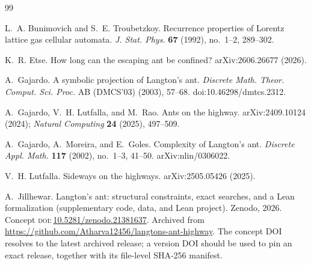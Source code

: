 \documentclass[11pt,reqno]{amsart}
\theoremstyle{plain}
\theoremstyle{definition}
\begin{document}
\begin{thebibliography}{99}

L.~A. Bunimovich and S.~E. Troubetzkoy.
\newblock Recurrence properties of {L}orentz lattice gas cellular automata.
\newblock \emph{J. Stat. Phys.} \textbf{67} (1992), no.~1--2, 289--302.

K.~R. Etse.
\newblock How long can the escaping ant be confined?
\newblock arXiv:2606.26677 (2026).

A.~Gajardo.
\newblock A symbolic projection of {L}angton's ant.
\newblock \emph{Discrete Math. Theor. Comput. Sci. Proc.} AB (DMCS'03)
  (2003), 57--68.
\newblock doi:10.46298/dmtcs.2312.

A.~Gajardo, V.~H. Lutfalla, and M.~Rao.
\newblock Ants on the highway.
\newblock arXiv:2409.10124 (2024); \emph{Natural Computing} \textbf{24} (2025), 497--509.

A.~Gajardo, A.~Moreira, and E.~Goles.
\newblock Complexity of {L}angton's ant.
\newblock \emph{Discrete Appl. Math.} \textbf{117} (2002), no.~1--3, 41--50.
\newblock arXiv:nlin/0306022.

V.~H. Lutfalla.
\newblock Sideways on the highways.
\newblock arXiv:2505.05426 (2025).

A.~Jillhewar.
\newblock Langton's ant: structural constraints, exact searches, and a Lean
formalization (supplementary code, data, and Lean project).
\newblock Zenodo, 2026. Concept \textsc{doi}:\,\href{https://doi.org/10.5281/zenodo.21381637}{10.5281/zenodo.21381637}.
\newblock Archived from \url{https://github.com/Atharva12456/langtons-ant-highway}.
\newblock The concept DOI resolves to the latest archived release; a version DOI should
be used to pin an exact release, together with its file-level SHA-256 manifest.

\end{thebibliography}
\end{document}
